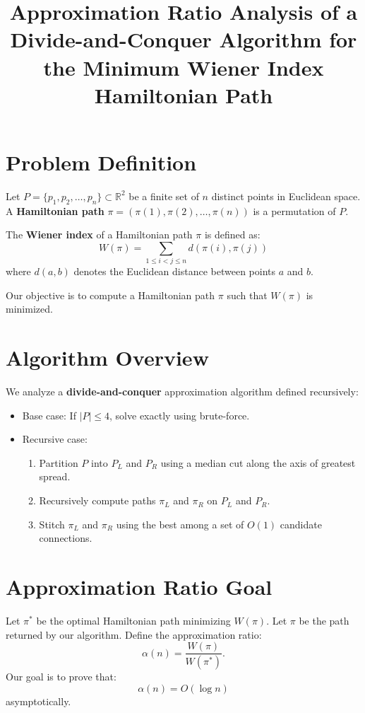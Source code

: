 \documentclass[11pt]{article}
\title{Approximation Ratio Analysis of a Divide-and-Conquer Algorithm for the Minimum Wiener Index Hamiltonian Path}
\author{}
\date{}
\begin{document}
\maketitle

\section{Problem Definition}

Let $P = \{p_1, p_2, \dots, p_n\} \subset \mathbb{R}^2$ be a finite set of $n$ distinct points in Euclidean space. A \textbf{Hamiltonian path} $\pi = (\pi(1), \pi(2), \dots, \pi(n))$ is a permutation of $P$.

The \textbf{Wiener index} of a Hamiltonian path $\pi$ is defined as:
\[
  W(\pi) = \sum_{1 \leq i < j \leq n} d(\pi(i), \pi(j))
\]
where $d(a, b)$ denotes the Euclidean distance between points $a$ and $b$.

Our objective is to compute a Hamiltonian path $\pi$ such that $W(\pi)$ is minimized.

\section{Algorithm Overview}

We analyze a \textbf{divide-and-conquer} approximation algorithm defined recursively:

\begin{itemize}
  \item Base case: If $|P| \leq 4$, solve exactly using brute-force.
  \item Recursive case:
    \begin{enumerate}
      \item Partition $P$ into $P_L$ and $P_R$ using a median cut along the axis of greatest spread.
      \item Recursively compute paths $\pi_L$ and $\pi_R$ on $P_L$ and $P_R$.
      \item Stitch $\pi_L$ and $\pi_R$ using the best among a set of $O(1)$ candidate connections.
    \end{enumerate}
\end{itemize}

\section{Approximation Ratio Goal}

Let $\pi^*$ be the optimal Hamiltonian path minimizing $W(\pi)$. Let $\pi$ be the path returned by our algorithm. Define the approximation ratio:
\[
  \alpha(n) = \frac{W(\pi)}{W(\pi^*)}.
\]
Our goal is to prove that:
\[
  \alpha(n) = O(\log n)
\]
asymptotically.
\end{document}
